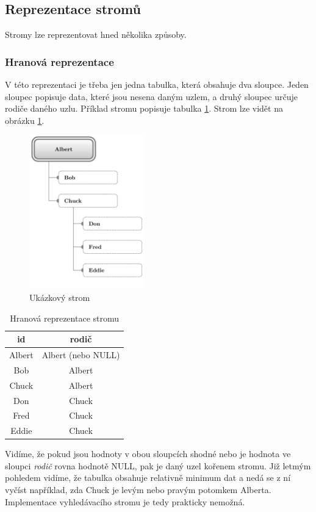 \subsection{Reprezentace stromů}
Stromy lze reprezentovat hned několika způsoby.

\subsubsection{Hranová reprezentace}
V této reprezentaci je třeba jen jedna tabulka, která obsahuje dva sloupce. Jeden sloupec popisuje data, které jsou nesena daným uzlem, a druhý sloupec určuje rodiče daného uzlu. Příklad stromu popisuje tabulka \ref{tab:str1}. Strom lze vidět na obrázku \ref{fig:stri}.

\begin{figure}
\centering\includegraphics[width=5cm]{graphics/02-strom}
\caption{Ukázkový strom}\label{fig:stri}
\end{figure}

\begin{table}
\centering
\caption{Hranová reprezentace stromu}\label{tab:str1}
\begin{tabular}{c | c}
id & rodič \\
\hline
Albert & Albert (nebo NULL) \\
Bob & Albert \\
Chuck & Albert \\
Don & Chuck \\
Fred & Chuck \\
Eddie & Chuck
\end{tabular}
\end{table}

Vidíme, že pokud jsou hodnoty v obou sloupcích shodné nebo je hodnota ve sloupci \textit{rodič} rovna hodnotě NULL, pak je daný uzel kořenem stromu. Již letmým pohledem vidíme, že tabulka obsahuje relativně minimum dat a nedá se z ní vyčíst například, zda Chuck je levým nebo pravým potomkem Alberta. Implementace vyhledávacího stromu je tedy prakticky nemožná.

